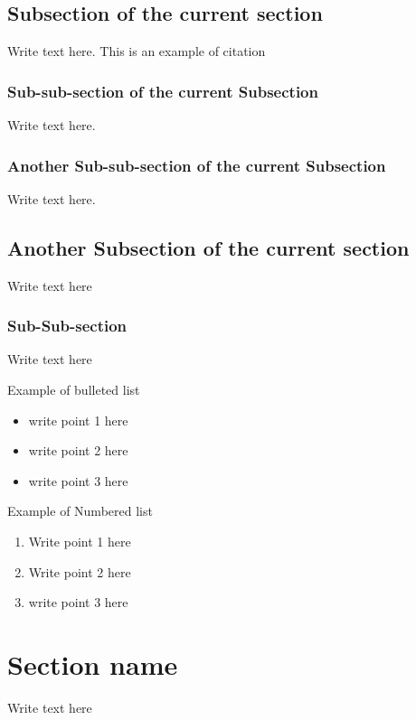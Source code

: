 \documentclass[12pt]{article}
\begin{document}
\subsection{Subsection of the current section}
Write text here. This is an example of citation 

\subsubsection{Sub-sub-section of the current Subsection}
Write text here.  

\subsubsection{Another Sub-sub-section of the current Subsection}
Write text here.   

\subsection{Another Subsection of the current section}
Write text here
\subsubsection{Sub-Sub-section}
Write text here

Example of bulleted list
\begin{itemize}
 \item write point 1 here \cite{SRS1998}\cite{SimpleCCP-Windows}
 \item write point 2 here
 \item write point 3 here
\end{itemize}

Example of Numbered list
\begin{enumerate}
 \item Write point 1 here
 \item Write point 2 here
 \item write point 3 here
\end{enumerate}

\section{Section name}
Write text here

\pagebreak
\end{document}
